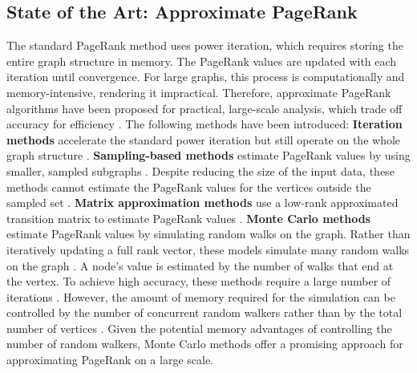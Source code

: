 \subsection{State of the Art: Approximate PageRank}

The standard PageRank method uses power iteration, which requires storing the entire graph structure in memory. The PageRank values are updated with each iteration until convergence. For large graphs, this process is computationally and memory-intensive, rendering it impractical. Therefore, approximate PageRank algorithms have been proposed for practical, large-scale analysis, which trade off accuracy for efficiency \cite{wu_efficient_2024}. The following methods have been introduced:
\textbf{Iteration methods} \cite{xie_parameterized_2023-1}\cite{anikin_efficient_2022} accelerate the standard power iteration but still operate on the whole graph structure \cite{wu_efficient_2024}. 
\textbf{Sampling-based methods} estimate PageRank values by using smaller, sampled subgraphs \cite{bar-yossef_local_2008}\cite{chen_local_2004}. Despite reducing the size of the input data, these methods cannot estimate the PageRank values for the vertices outside the sampled set \cite{wu_efficient_2024}.
\textbf{Matrix approximation methods} use a low-rank approximated transition matrix to estimate PageRank values \cite{liu_fast_2015}\cite{benczur_feasibility_2005}. 
\textbf{Monte Carlo methods} estimate PageRank values by simulating random walks on the graph. Rather than iteratively updating a full rank vector, these models simulate many random walks on the graph \cite{avrachenkov_monte_2007}. A node's value is estimated by the number of walks that end at the vertex. To achieve high accuracy, these methods require a large number of iterations \cite{wu_efficient_2024}. However, the amount of memory required for the simulation can be controlled by the number of concurrent random walkers rather than by the total number of vertices \cite{avrachenkov_monte_2007}. Given the potential memory advantages of controlling the number of random walkers, Monte Carlo methods offer a promising approach for approximating PageRank on a large scale.